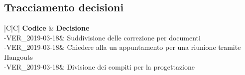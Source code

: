 \documentclass[a4paper,12pt]{article}
\begin{document}
    	\newpage
	\subsection{Tracciamento decisioni}
	\begin{table}[tbph]
		\centering
		\begin{tabularx}{\textwidth}{|C|C|}
			\hline
			\textbf{Codice } & \textbf{Decisione} \\
			-VER\_2019-03-18& Suddivisione delle correzione per documenti \\
			-VER\_2019-03-18& Chiedere alla   un appuntamento per una riunione tramite Hangouts\\
			-VER\_2019-03-18& Divisione dei compiti per la progettazione\\
			\hline
		\end{tabularx}
		\caption{Tracciamento decisioni}
	\end{table}

	\label{LastPage}
\end{document}

